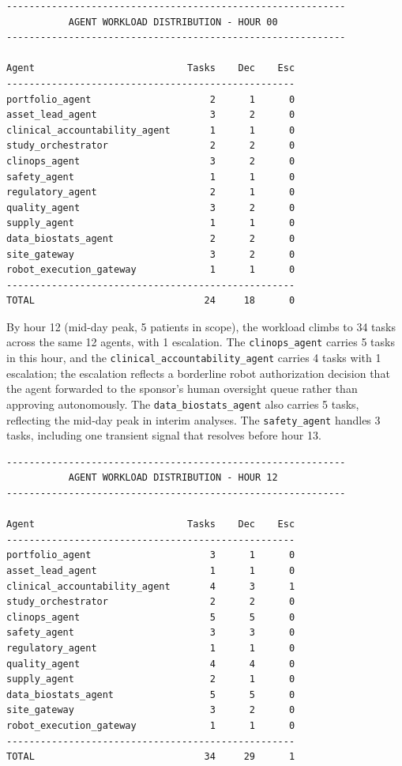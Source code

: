 \begin{verbatim}
------------------------------------------------------------
           AGENT WORKLOAD DISTRIBUTION - HOUR 00
------------------------------------------------------------

Agent                           Tasks    Dec    Esc
---------------------------------------------------
portfolio_agent                     2      1      0
asset_lead_agent                    3      2      0
clinical_accountability_agent       1      1      0
study_orchestrator                  2      2      0
clinops_agent                       3      2      0
safety_agent                        1      1      0
regulatory_agent                    2      1      0
quality_agent                       3      2      0
supply_agent                        1      1      0
data_biostats_agent                 2      2      0
site_gateway                        3      2      0
robot_execution_gateway             1      1      0
---------------------------------------------------
TOTAL                              24     18      0
\end{verbatim}

By hour 12 (mid-day peak, 5 patients in scope), the workload climbs
to 34 tasks across the same 12 agents, with 1 escalation. The
\texttt{clinops\_agent} carries 5 tasks in this hour, and the
\texttt{clinical\_accountability\_agent} carries 4 tasks with 1
escalation; the escalation reflects a borderline robot authorization
decision that the agent forwarded to the sponsor's human oversight
queue rather than approving autonomously. The
\texttt{data\_biostats\_agent} also carries 5 tasks, reflecting the
mid-day peak in interim analyses. The \texttt{safety\_agent} handles
3 tasks, including one transient signal that resolves before hour 13.

\begin{verbatim}
------------------------------------------------------------
           AGENT WORKLOAD DISTRIBUTION - HOUR 12
------------------------------------------------------------

Agent                           Tasks    Dec    Esc
---------------------------------------------------
portfolio_agent                     3      1      0
asset_lead_agent                    1      1      0
clinical_accountability_agent       4      3      1
study_orchestrator                  2      2      0
clinops_agent                       5      5      0
safety_agent                        3      3      0
regulatory_agent                    1      1      0
quality_agent                       4      4      0
supply_agent                        2      1      0
data_biostats_agent                 5      5      0
site_gateway                        3      2      0
robot_execution_gateway             1      1      0
---------------------------------------------------
TOTAL                              34     29      1
\end{verbatim}

